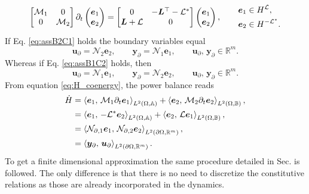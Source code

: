 \begin{equation}
	\label{eq:pHsys_dyn_linass} 
	\begin{bmatrix}
	\mathcal{M}_1 & 0 \\
	0 & \mathcal{M}_2 \\
	\end{bmatrix}
	\partial_t \begin{pmatrix}
	\bm{e}_1 \\ \bm{e}_2
	\end{pmatrix} = \begin{bmatrix}
	0 & -\bm{L}^\top - \mathcal{L}^* \\
	\bm{L} + \mathcal{L} & 0 \\
	\end{bmatrix}\begin{pmatrix}
	\bm{e}_1 \\ \bm{e}_2
	\end{pmatrix} , \qquad \begin{aligned}
	\bm{e}_1 &\in H^{\mathcal{L}}, 	\\
	\bm{e}_2 &\in H^{-\mathcal{L}^*}.
	\end{aligned}\\
\end{equation}
If Eq. \eqref{eq:assB2C1} holds the boundary variables equal 
\begin{equation}
\bm{u}_\partial = \mathcal{N}_2 \displaystyle \bm{e}_2, \qquad  \bm{y}_\partial = \mathcal{N}_1 \displaystyle \bm{e}_1, \qquad  \bm{u}_\partial,\, \bm{y}_\partial \in \mathbb{R}^m.
\end{equation}
Whereas if Eq. \eqref{eq:assB1C2} holds, then
\begin{equation}
\bm{u}_\partial = \mathcal{N}_1 \displaystyle \bm{e}_1, \qquad 
\bm{y}_\partial = \mathcal{N}_2 \displaystyle \bm{e}_2, \qquad  \bm{u}_\partial,\, \bm{y}_\partial \in \mathbb{R}^m. 
\end{equation}
From equation \eqref{eq:H_coenergy}, the power balance reads
\begin{equation}\label{eq:powbal_lin}
\begin{aligned}
\dot{H} &= \inner[L^2(\Omega, \mathbb{A})]{\bm{e}_1}{\mathcal{M}_1 \partial_{t} \bm{e}_1} + \inner[L^2(\Omega, \mathbb{B})]{\bm{e}_2}{\mathcal{M}_2 \partial_{t} \bm{e}_2}, \\
&=\inner[L^2(\Omega, \mathbb{A})]{\bm{e}_1}{-\mathcal{L}^* \bm{e}_2} + \inner[L^2(\Omega, \mathbb{B})]{\bm{e}_2}{\mathcal{L} \bm{e}_1}, \\
&= \inner[L^2(\partial \Omega, \mathbb{R}^m)]{\mathcal{N}_{\partial, 1} \bm{e}_1}{\mathcal{N}_{\partial, 2} \bm{e}_2}, \\
&= \inner[L^2(\partial \Omega, \mathbb{R}^m)]{\bm{y}_\partial}{\bm{u}_\partial}.
\end{aligned}
\end{equation}
To get a finite dimensional approximation the same procedure detailed in Sec.  is followed. The only difference is that there is no need to discretize the constitutive relations as those are already incorporated in the dynamics. 

